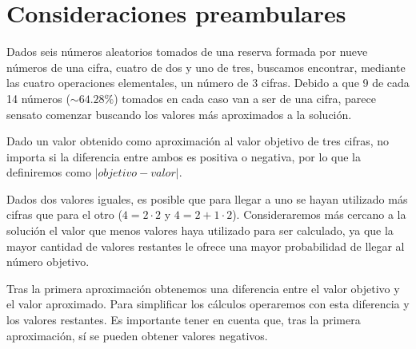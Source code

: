 \chapter{Consideraciones preambulares}

Dados seis números aleatorios tomados de una reserva formada por nueve números de una cifra, cuatro de dos y uno de tres, buscamos encontrar, mediante las cuatro operaciones elementales, un número de 3 cifras.
Debido a que 9 de cada 14 números ($\sim64.28\%$) tomados en cada caso van a ser de una cifra, parece sensato comenzar buscando los valores más aproximados a la solución.

Dado un valor obtenido como aproximación al valor objetivo de tres cifras, no importa si la diferencia entre ambos es positiva o negativa, por lo que la definiremos como $\lvert objetivo-valor\rvert$.

Dados dos valores iguales, es posible que para llegar a uno se hayan utilizado más cifras que para el otro ($4=2\cdot2$ y $4=2+1\cdot2$).
Consideraremos más cercano a la solución el valor que menos valores haya utilizado para ser calculado, ya que la mayor cantidad de valores restantes le ofrece una mayor probabilidad de llegar al número objetivo.

Tras la primera aproximación obtenemos una diferencia entre el valor objetivo y el valor aproximado.
Para simplificar los cálculos operaremos con esta diferencia y los valores restantes.
Es importante tener en cuenta que, tras la primera aproximación, sí se pueden obtener valores negativos.

